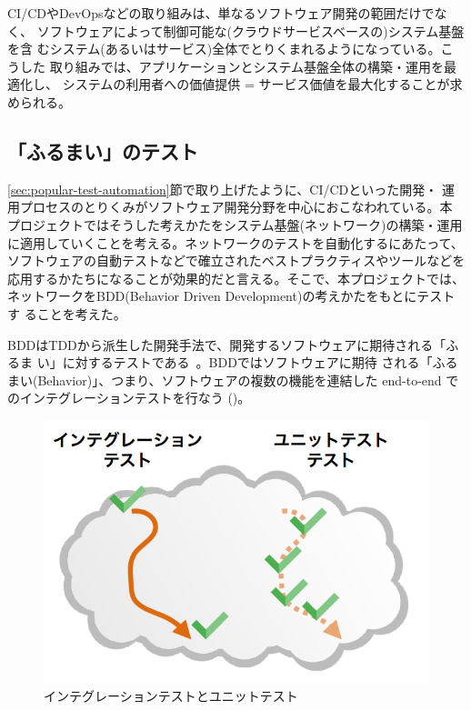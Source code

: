 CI/CDやDevOpsなどの取り組みは、単なるソフトウェア開発の範囲だけでなく、
ソフトウェアによって制御可能な(クラウドサービスベースの)システム基盤を含
むシステム(あるいはサービス)全体でとりくまれるようになっている。こうした
取り組みでは、アプリケーションとシステム基盤全体の構築・運用を最適化し、
システムの利用者への価値提供 = サービス価値を最大化することが求められる。

  \subsection{「ふるまい」のテスト}
  \label{sec:behavior-test}


\ref{sec:popular-test-automation}節で取り上げたように、CI/CDといった開発・
運用プロセスのとりくみがソフトウェア開発分野を中心におこなわれている。本
プロジェクトではそうした考えかたをシステム基盤(ネットワーク)の構築・運用
に適用していくことを考える。ネットワークのテストを自動化するにあたって、
ソフトウェアの自動テストなどで確立されたベストプラクティスやツールなどを
応用するかたちになることが効果的だと言える。そこで、本プロジェクトでは、
ネットワークをBDD(Behavior Driven Development)の考えかたをもとにテストす
ることを考えた。

BDDはTDDから派生した開発手法で、開発するソフトウェアに期待される「ふるま
い」に対するテストである~\cite{wikipedia-bdd}。BDDではソフトウェアに期待
される「ふるまい(Behavior)」、つまり、ソフトウェアの複数の機能を連結した
end-to-end でのインテグレーションテストを行なう
()。

\begin{figure}[h]
 \centering
 \includegraphics[scale=0.6]{img/test-difference.png}
 \caption{インテグレーションテストとユニットテスト}
 \label{fig:test-difference}
\end{figure}

